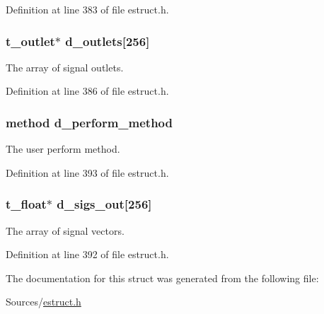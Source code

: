 Definition at line 383 of file estruct.\-h.

\hypertarget{struct__edspobj_a529a1e3597eb3ee79f6cabef51f41ef9}{
\subsubsection[{d\-\_\-outlets}]{\setlength{\rightskip}{0pt plus 5cm}t\-\_\-outlet$\ast$ d\-\_\-outlets\mbox{[}256\mbox{]}}}\label{struct__edspobj_a529a1e3597eb3ee79f6cabef51f41ef9}
The array of signal outlets. 

Definition at line 386 of file estruct.\-h.

\hypertarget{struct__edspobj_ae13acca7c0f073f1030545ce368e6e03}{
\subsubsection[{d\-\_\-perform\-\_\-method}]{\setlength{\rightskip}{0pt plus 5cm}method d\-\_\-perform\-\_\-method}}\label{struct__edspobj_ae13acca7c0f073f1030545ce368e6e03}
The user perform method. 

Definition at line 393 of file estruct.\-h.

\hypertarget{struct__edspobj_aebb3e36050cca90ec2bbfc8226198ca8}{
\subsubsection[{d\-\_\-sigs\-\_\-out}]{\setlength{\rightskip}{0pt plus 5cm}t\-\_\-float$\ast$ d\-\_\-sigs\-\_\-out\mbox{[}256\mbox{]}}}\label{struct__edspobj_aebb3e36050cca90ec2bbfc8226198ca8}
The array of signal vectors. 

Definition at line 392 of file estruct.\-h.



The documentation for this struct was generated from the following file\-:\begin{DoxyCompactItemize}
\item 
Sources/\hyperlink{estruct_8h}{estruct.\-h}\end{DoxyCompactItemize}
